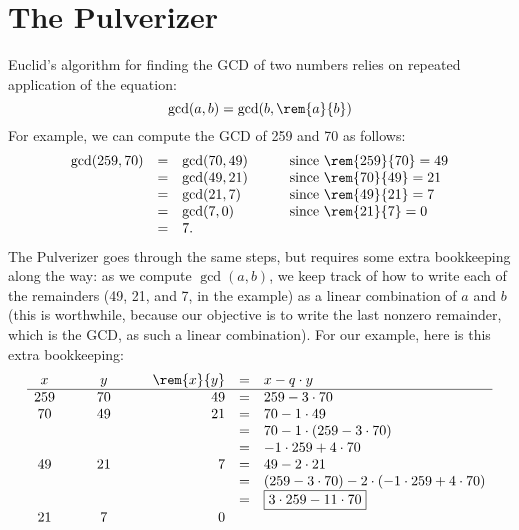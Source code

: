 \documentclass[quiz]{mcs}
\begin{document}
\section{The Pulverizer}
Euclid's algorithm for finding the GCD of two numbers relies on
repeated application of the equation: 
\[
\gcd(a, b) = \gcd(b, \rem{a}{b})
\]
For example, we can compute the GCD of 259 and 70 as follows:
\[
\begin{array}{rclcl}
\gcd(259, 70)
    & = & \gcd(70, 49) & \quad & \text{since $\rem{259}{70} = 49$}\\
    & = & \gcd(49, 21) && \text{since $\rem{70}{49} = 21$} \\
    & = & \gcd(21, 7) && \text{since $\rem{49}{21} = 7$} \\
    & = & \gcd(7, 0) && \text{since $\rem{21}{7} = 0$} \\
    & = & 7.
\end{array}
\]
The Pulverizer goes through the same steps, but requires some extra
bookkeeping along the way: as we compute $\gcd(a, b)$, we keep track
of how to write each of the remainders (49, 21, and 7, in the example)
as a linear combination of $a$ and $b$ (this is worthwhile, because
our objective is to write the last nonzero remainder, which is the
GCD, as such a linear combination).  For our example, here is this
extra bookkeeping:
\[
\begin{array}{ccccrcl}
x & \quad & y & \quad & \rem{x}{y} & = & x - q \cdot y \\ \hline
259 && 70 && 49 & = &   259 - 3 \cdot 70 \\
70 && 49 && 21  & = &   70 - 1 \cdot 49 \\
&&&&            & = &   70 - 1 \cdot (259 - 3 \cdot 70) \\
&&&&            & = &   -1 \cdot 259 + 4 \cdot 70 \\
49 && 21 && 7   & = &   49 - 2 \cdot 21 \\
&&&&            & = &   (259 - 3 \cdot 70) -
                                2 \cdot (-1 \cdot 259 + 4 \cdot 70) \\
&&&&            & = &   \fbox{$3 \cdot 259 - 11 \cdot 70$} \\
21 && 7 && 0
\end{array}
\]
\end{document}
